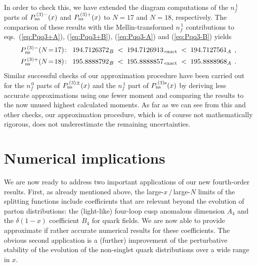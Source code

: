 \documentclass[12pt]{article}
\newcommand{\bea}{\begin{eqnarray}}
\newcommand{\eea}{\end{eqnarray}}
\newcommand{\nn}{\nonumber}
\def\nfz{{n^{\,0}_{\! f}}}
\def\nfo{{n^{\,1}_{\! f}}}
\def\xm1{{(1 \! - \! x)}}
\begin{document}
In order to check this, we have extended the diagram computations of
the $\nfo$ parts of $P_{\rm ns}^{\,(3)-}(x)$ and $P_{\rm ns}^{\,(3)+}(x)$
to $N=17$ and $N=18$, respectively. The comparison of these results with
the Mellin-transformed $\nfo$ contributions to eqs.~(\ref{eq:Pqq3+A}), 
(\ref{eq:Pqq3+B}), (\ref{eq:Pqq3-A}) and (\ref{eq:Pqq3-B}) yields
%
\bea
  P_{\rm ns}^{\,(3)-}(N\!=\!17) &\! :\!&
  194.7126372_{\:\!B}  \; < \; 194.7126913_{\,\rm exact} \; < \; 194.7127561_A
\:\: ,
\nn \\
  P_{\rm ns}^{\,(3)+}(N\!=\!18) &\! :\!&
  195.8888792_{\:\!B}  \; < \; 195.8888857_{\,\rm exact} \; < \; 195.8888968_A 
\:\: .
\eea
%
Similar successful checks of our approximation procedure have been carried
out for the $\nfz$ parts of $P_{\rm ns}^{\,(3)\pm}(x)$ and the $\nfo$ part 
of $P_{\rm ns}^{\,(3)\rm s}(x)$ by deriving less accurate approximations 
using one fewer moment and comparing the results to the now unused highest 
calculated moments. 
As far as we can see from this and other checks, our approximation procedure, 
which is of course not mathematically rigorous, does not underestimate the 
remaining uncertainties.

\setcounter{equation}{0}
\section{Numerical implications}
\label{sec:numerics}

We are now ready to address two important applications of our new fourth-order 
results.
First, as already mentioned above, the large-$x\,/\,$large-$N$ limits of the 
splitting functions include coefficients that are relevant beyond the evolution
of parton distributions: the (light-like) four-loop cusp anomalous dimension 
$A_4$ and the $\delta\xm1$ coefficient $B_4$ for quark fields.
We are now able to provide approximate if rather accurate numerical results 
for these coefficients.
The obvious second application is a (further) improvement of the perturbative 
stability of the evolution of the  non-singlet quark distributions over a wide 
range in $x$.
\end{document}
